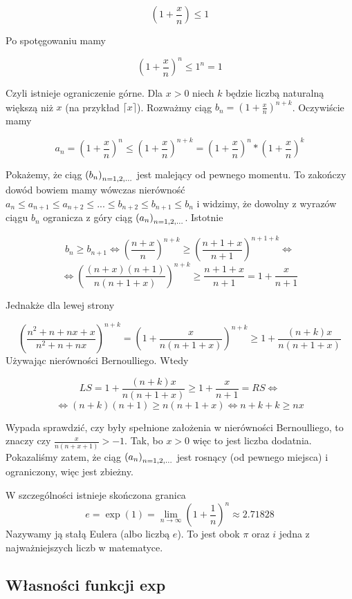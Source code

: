 \documentclass[9pt]{article}
\begin{document}
\[
    \left(1+\frac{x}{n}\right) \le 1
\]

Po spotęgowaniu mamy

\[
    \left(1+\frac{x}{n}\right)^n \le 1^n = 1
\]

Czyli istnieje ograniczenie górne. Dla $x > 0$ niech $k$ będzie liczbą naturalną większą niż $x$ (na
przykład $\lceil x \rceil$). Rozważmy ciąg $b_n = \left(1 + \frac{x}{n}\right)^{n+k}$. Oczywiście
mamy

\[
    a_n = \left(1 + \frac{x}{n}\right)^n \le \left(1 + \frac{x}{n}\right)^{n+k} =
    \left(1+\frac{x}{n}\right)^n * \left(1 + \frac{x}{n}\right)^k
\]

Pokażemy, że ciąg $\left(b_n\right)_{n = 1,2,...}$ jest malejący od pewnego momentu. To zakończy dowód bowiem mamy
wówczas nierówność $a_n \le a_{n+1} \le a_{n+2} \le ... \le b_{n+2} \le b_{n+1} \le b_n$ i widzimy,
że dowolny z wyrazów ciągu $b_n$ ogranicza z góry ciąg $\left(a_n\right)_{n = 1,2,...}$. Istotnie 

\[
    b_n \ge b_{n+1} \iff \left(\frac{n+x}{n}\right)^{n+k} \ge \left(\frac{n+1+x}{n+1}\right)^{n+1+k}
    \iff
\]
\[
    \iff \left(\frac{(n+x)(n+1)}{n(n+1+x)}\right)^{n+k} \ge \frac{n+1+x}{n+1} = 1 + \frac{x}{n+1}
\]

Jednakże dla lewej strony

\[
    \left(\frac{n^2 + n + nx + x}{n^2 + n + nx}\right)^{n+k} = \left(1 +
    \frac{x}{n(n+1+x)}\right)^{n+k} \ge 1+\frac{(n+k)x}{n(n+1+x)}
\]
Używając nierówności Bernoulliego. Wtedy 

\[
    LS = 1+\frac{(n+k)x}{n(n+1+x)} \ge 1+\frac{x}{n+1} = RS \iff
\]
\[
    \iff (n+k)(n+1) \ge n(n+1+x) \iff n+k+k \ge nx
\]

Wypada sprawdzić, czy były spełnione założenia w nierówności Bernoulliego, to znaczy czy
$\frac{x}{n(n+x+1)} > -1$. Tak, bo $x > 0$ więc to jest liczba dodatnia. Pokazaliśmy zatem, że ciąg
$\left(a_n\right)_{n = 1,2,...}$ jest rosnący (od pewnego miejsca) i ograniczony, więc jest zbieżny.

\begin{Def}
    W szczególności istnieje skończona granica
    \[
        e = \exp(1) = \lim_{n \to \infty}\left(1+\frac{1}{n}\right)^n \approx 2.71828
    \]
    Nazywamy ją stałą Eulera (albo liczbą $e$). To jest obok $\pi$ oraz $i$ jedna z najważniejszych
    liczb w matematyce.
\end{Def}

\subsection{Własności funkcji exp}
\end{document}
